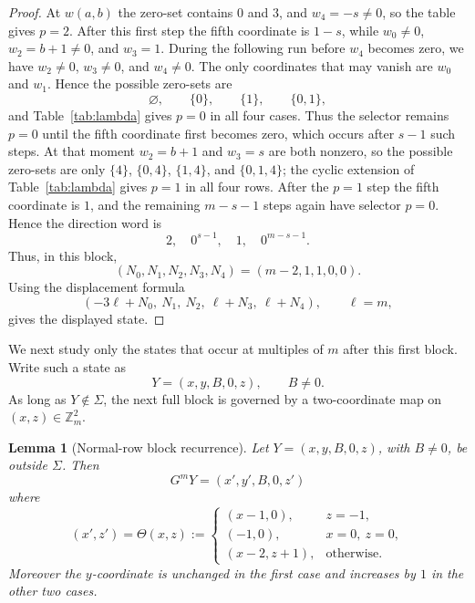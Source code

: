 \documentclass[11pt]{article}
\newtheorem{lemma}{Lemma}
\theoremstyle{definition}
\begin{document}
\begin{proof}
At \(w(a,b)\) the zero-set contains \(0\) and \(3\), and \(w_4=-s\ne0\), so the table gives \(p=2\).
After this first step the fifth coordinate is \(1-s\), while \(w_0\ne0\), \(w_2=b+1\ne0\), and
\(w_3=1\).  During the following run before \(w_4\) becomes zero, we have
\(w_2\ne0\), \(w_3\ne0\), and \(w_4\ne0\).  The only coordinates that may vanish are \(w_0\) and
\(w_1\).  Hence the possible zero-sets are
\[
\varnothing,\qquad \{0\},\qquad \{1\},\qquad \{0,1\},
\]
and Table~\ref{tab:lambda} gives \(p=0\) in all four cases.  Thus the selector remains
\(p=0\) until the fifth coordinate first becomes zero, which occurs after \(s-1\) such steps.  At that
moment \(w_2=b+1\) and \(w_3=s\) are both nonzero, so the possible zero-sets are only
\(\{4\}\), \(\{0,4\}\), \(\{1,4\}\), and \(\{0,1,4\}\); the cyclic extension of Table~\ref{tab:lambda} gives
\(p=1\) in all four rows.  After the
\(p=1\) step the fifth coordinate is \(1\), and the remaining \(m-s-1\) steps again have selector
\(p=0\).  Hence the direction word is
\[
2,\quad 0^{s-1},\quad 1,\quad 0^{m-s-1}.
\]
Thus, in this block,
\[
(N_0,N_1,N_2,N_3,N_4)=(m-2,1,1,0,0).
\]
Using the displacement formula
\[
(-3\ell+N_0,\ N_1,\ N_2,\ \ell+N_3,\ \ell+N_4),\qquad \ell=m,
\]
gives the displayed state.
\end{proof}

We next study only the states that occur at multiples of \(m\) after this first block.  Write such a
state as
\[
Y=(x,y,B,0,z),\qquad B\ne0.
\]
As long as \(Y\notin\Sigma\), the next full block is governed by a two-coordinate map on \((x,z)
\in\mathbb Z_m^2\).

\begin{lemma}[Normal-row block recurrence]\label{lem:blockrecurrence}
Let \(Y=(x,y,B,0,z)\), with \(B\ne0\), be outside \(\Sigma\).  Then
\[
G^mY=(x',y',B,0,z')
\]
where
\[
(x',z')=
\Theta(x,z):=
\begin{cases}
(x-1,0),& z=-1,\\
(-1,0),& x=0,\ z=0,\\
(x-2,z+1),&\text{otherwise.}
\end{cases}
\tag{$\Theta$}
\]
Moreover the \(y\)-coordinate is unchanged in the first case and increases by \(1\) in the other two
cases.
\end{lemma}
\end{document}
